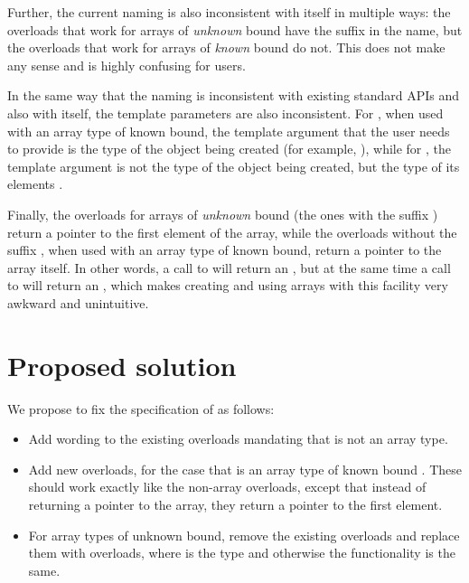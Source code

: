 Further, the current naming is also inconsistent with itself in multiple ways: the overloads that work for arrays of \emph{unknown} bound have the suffix  in the name, but the overloads that work for arrays of \emph{known} bound do not. This does not make any sense and is highly confusing for users.

In the same way that the naming is inconsistent with existing standard APIs and also with itself, the template parameters are also inconsistent. For , when used with an array type  of known bound, the template argument that the user needs to provide is the type  of the object being created (for example, ), while for , the template argument is not the type  of the object being created, but the type of its elements .

Finally, the overloads for arrays of \emph{unknown} bound (the ones with the suffix ) return a pointer to the first element of the array, while the overloads without the suffix , when used with an array type of known bound, return a pointer to the array itself. In other words, a call to  will return an , but at the same time a call to  will return an , which makes creating and using arrays with this facility very awkward and unintuitive.

\section{Proposed solution}
\label{sec:solution}

We propose to fix the specification of  as follows:

\begin{itemize}
\item Add wording to the existing  overloads mandating that  is not an array type.
\item Add new  overloads, for the case that  is an array type of known bound . These should work exactly like the non-array overloads, except that instead of returning a pointer to the array, they return a pointer to the first element.
\item For array types of unknown bound, remove the existing \mbox{} overloads and replace them with  overloads, where  is the type  and otherwise the functionality is the same.
\end{itemize}

